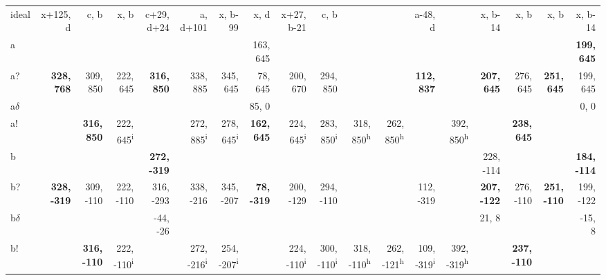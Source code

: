 \begin{table}[p]
{\begin{tabular}{lrrrrrrrrrrrrrrrrr}
ideal & x+125, d & c, b & x, b & c+29, d+24 & a, d+101 & x, b-99 & x, d & x+27, b-21 & c, b &  &  & a-48, d &  & x, b-14 & x, b & x, b & x, b-14 \\
a &  &  &  &  &  &  & 163, 645 &  &  &  &  &  &  &  &  &  & \textbf{199, 645} \\
a? & \textbf{328, 768} & 309, 850 & 222, 645 & \textbf{316, 850} & 338, 885 & 345, 645 & 78, 645 & 200, 670 & 294, 850 &  &  & \textbf{112, 837} &  & \textbf{207, 645} & 276, 645 & \textbf{251, 645} & 199, 645 \\
a$\delta$ &  &  &  &  &  &  & 85, 0 &  &  &  &  &  &  &  &  &  & 0, 0 \\
a! &  & \textbf{316, 850} & 222, 645\textsuperscript{i} &  & 272, 885\textsuperscript{i} & 278, 645\textsuperscript{i} & \textbf{162, 645} & 224, 645\textsuperscript{i} & 283, 850\textsuperscript{i} & 318, 850\textsuperscript{h} & 262, 850\textsuperscript{h} &  & 392, 850\textsuperscript{h} &  & \textbf{238, 645} &  &  \\
b &  &  &  & \textbf{272, -319} &  &  &  &  &  &  &  &  &  & 228, -114 &  &  & \textbf{184, -114} \\
b? & \textbf{328, -319} & 309, -110 & 222, -110 & 316, -293 & 338, -216 & 345, -207 & \textbf{78, -319} & 200, -129 & 294, -110 &  &  & 112, -319 &  & \textbf{207, -122} & 276, -110 & \textbf{251, -110} & 199, -122 \\
b$\delta$ &  &  &  & -44, -26 &  &  &  &  &  &  &  &  &  & 21, 8 &  &  & -15, 8 \\
b! &  & \textbf{316, -110} & 222, -110\textsuperscript{i} &  & 272, -216\textsuperscript{i} & 254, -207\textsuperscript{i} &  & 224, -110\textsuperscript{i} & 300, -110\textsuperscript{i} & 318, -110\textsuperscript{h} & 262, -121\textsuperscript{h} & 109, -319\textsuperscript{i} & 392, -319\textsuperscript{h} &  & \textbf{237, -110} &  &  \\

\end{tabular}}
\end{table}
